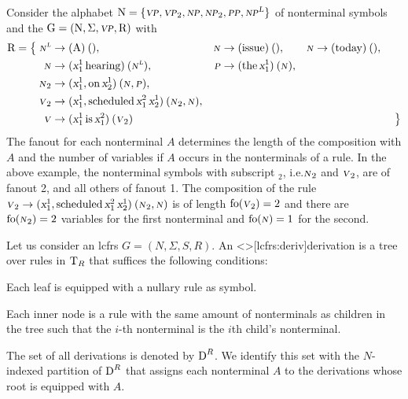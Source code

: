 \documentclass[../../document.tex]{subfiles}
\begin{document}
    \begin{example}\label{ex:lcfrs:rules}
        Consider the alphabet \(\mathrm{N} = \{\textsc{\textsl{vp}}, \textsc{\textsl{vp}}_2, \textsc{\textsl{np}}, \textsc{\textsl{np}}_2, \textsc{\textsl{pp}}, \textsc{\textsl{np}}^{\textsc{\textsl{L}}}\}\) of nonterminal symbols and the  \(\mathrm{G} = (\mathrm{N}, \Sigma, \textsc{\textsl{vp}}, \mathrm{R})\) with
        \begin{align*}
            \mathrm{R} = \big\{\;
            \textsc{\textsl{n}}^{\textsc{\textsl{l}}} &\to (\text{A})\:(), &\textsc{\textsl{n}} &\to (\text{issue})\:(), &\textsc{\textsl{n}} &\to (\text{today})\:(), &\\
            \textsc{\textsl{n}} &\to (\textsl{x}_1^1 \, \text{hearing})\:(\textsc{\textsl{n}}^{\textsc{\textsl{l}}}), &\textsc{\textsl{p}} &\to (\text{the}\,\textsl{x}_1^1)\:(\textsc{\textsl{n}}), \\
            \textsc{\textsl{n}}_2 &\to (\textsl{x}_1^1, \text{on} \, \textsl{x}_2^1)\:(\textsc{\textsl{n}}, \textsc{\textsl{p}}), \\
            \textsc{\textsl{v}}_2 &\to (\textsl{x}_1^1, \text{scheduled} \, \textsl{x}_1^2 \, \textsl{x}_2^1)\:(\textsc{\textsl{n}}_2, \textsc{\textsl{n}}), \\
            \textsc{\textsl{v}} &\to (\textsl{x}_1^1 \, \text{is} \, \textsl{x}_1^2)\:(\textsc{\textsl{v}}_2)
            &&&&&\;\big\}
        \end{align*}
        The fanout for each nonterminal \(A\) determines the length of the composition with  \(A\) and the number of variables if \(A\) occurs in the  nonterminals of a rule.
        In the above example, the nonterminal symbols with subscript \(_2\), i.e.\@ \(\textsc{\textsl{n}}_2\) and \(\textsc{\textsl{v}}_2\), are of fanout 2, and all others of fanout 1.
        The composition of the rule \(\textsc{\textsl{v}}_2 \to (\textsl{x}_1^1, \text{scheduled} \, \textsl{x}_1^2 \, \textsl{x}_2^1)\:(\textsc{\textsl{n}}_2, \textsc{\textsl{n}})\) is of length \(\operatorname{fo}(\textsc{\textsl{v}}_2) = 2\) and there are \(\operatorname{fo}(\textsc{\textsl{n}}_2) = 2\) variables for the first  nonterminal and \(\operatorname{fo}(\textsc{\textsl{n}}) = 1\) for the second.
    \end{example}

    \begin{definition}[Derivation]
        Let us consider an lcfrs \(G = (N, \varSigma, S, R)\).
        An  <\lcfrs>[lcfrs:deriv]{derivation} is a tree over rules in \(\operatorname{T}_R\) that suffices the following conditions:
        \begin{compactitem}
            \item Each leaf is equipped with a nullary rule as symbol.
            \item Each inner node is a rule with the same amount of  nonterminals as children in the tree such that the \(i\)-th  nonterminal is the \(i\)th child's  nonterminal.
        \end{compactitem}
        The set of all  derivations is denoted by \(\operatorname{D}^R\).
        We identify this set with the \(N\)-indexed partition of \(\operatorname{D}^R\) that assigns each nonterminal \(A\) to the derivations whose root is equipped with  \(A\).
    \end{definition}
\end{document}
